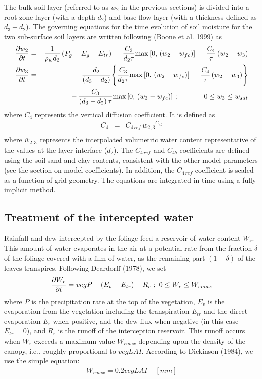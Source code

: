 The bulk soil layer (referred to as $w_2$ in the previous sections)
is divided into a root-zone layer (with a depth $d_2$) and base-flow layer
(with a thickness defined as $d_3-d_2$).
The governing equations for the time evolution of
soil moisture for the two sub-surface soil layers are written
following (Boone et al. 1999) as
%
\begin{eqnarray}
%
{\partial w_2\over\partial t} &=&
{1\over \rho_w d_2}\left(P_g-E_g-E_{tr}\right)
\,-\, {C_3\over d_2\tau} {\rm max}\left[0,\,\left(w_2-w_{fc}\right)\right]
\,-\, {C_4\over\tau} \left(w_2-w_3\right) \\
%
{\partial w_3\over\partial t} &=&
{d_2\over \left(d_3-d_2\right)}
\Biggr\lbrace
{C_3\over d_2\tau} {\rm max}\left[0,\,\left(w_2-w_{fc}\right)\right]
\,+\, {C_4\over\tau} \left(w_2-w_3\right)
\Biggr\rbrace \\
& & \,-\,
{C_3\over \left(d_3-d_2\right)\tau}
{\rm max}\left[0,\,\left(w_3-w_{fc}\right)\right] \,;
\hskip.5in 0 \leq w_3 \leq w_{sat}
%
\end{eqnarray}
%
where $C_4$ represents the vertical diffusion coefficient.
It is defined as
%
\begin{eqnarray}
%
C_4 & =& {C_{4\, ref}} \,{{\overline w}_{2,3}}^{C_{4b}} \\
%
\end{eqnarray}
%
where ${\overline w_{2,3}}$ represents the interpolated volumetric water
content representative of the values at the layer interface ($d_2$).
The $C_{4\, ref}$ and $C_{4b}$ coefficients are defined using the soil
sand and clay contents, consistent with the
other model parameters (see the section on model coefficients). In addition,
the $C_{4\, ref}$ coefficient is scaled as a function of grid geometry.
The equations are integrated in time using a fully implicit method.

\subsection{Treatment of the intercepted water}

Rainfall and dew intercepted by the foliage feed a
reservoir of water content $W_r$.  This amount of water
evaporates in the air at a potential rate from the fraction
$\delta$ of the foliage covered with a film of water, as the
remaining part $(1-\delta)$ of the leaves transpires.
Following Deardorff (1978), we set
\begin{eqnarray}
{\partial W_r \over \partial t} = veg P - (E_v-E_{tr}) - R_r \ ; \
0 \leq W_r \leq W_{rmax}
\end{eqnarray}
where $P$ is the precipitation rate at the top of the vegetation,
$E_v$ is the evaporation from the vegetation including the
transpiration $E_{tr}$ and the direct evaporation $E_r$ when
positive, and the dew flux when negative (in this case $E_{tr} = 0$),
and $R_r$ is the runoff of the interception reservoir.
This runoff occurs when $W_r$ exceeds a maximum value $W_{rmax}$
depending upon the density of the canopy, i.e., roughly proportional
to $veg LAI$.
According to Dickinson (1984), we use the simple equation:
\begin{eqnarray}
W_{rmax} = 0.2 veg LAI \ \ \ \ \ [mm]
\end{eqnarray}

